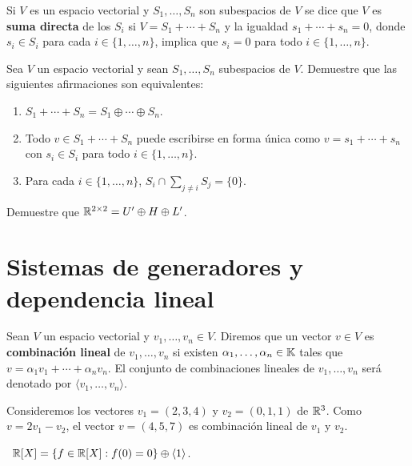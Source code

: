 \begin{block}
    Si $V$ es un espacio vectorial y $S_1,\dots,S_n$ son subespacios de $V$ se
    dice que $V$ es \textbf{suma directa} de los $S_i$ si $V=S_1+\cdots+S_n$ y
    la igualdad $s_1+\cdots+s_n=0$, donde $s_i\in S_i$ para cada
    $i\in\{1,\dots,n\}$, implica que $s_i=0$ para todo $i\in\{1,\dots,n\}$.
\end{block}

\begin{xca}
    Sea $V$ un espacio vectorial y sean $S_1,\dots,S_n$ subespacios de $V$.
    Demuestre que las siguientes afirmaciones son equivalentes:
    \begin{enumerate}
        \item $S_1+\cdots+S_n=S_1\oplus\cdots\oplus S_n$.
        \item Todo $v\in S_1+\cdots+S_n$ puede escribirse en forma única como
            $v=s_1+\cdots+s_n$ con $s_i\in S_i$ para todo $i\in\{1,\dots,n\}$. 
        \item Para cada $i\in\{1,\dots,n\}$, $S_i\cap \sum_{j\ne i}S_j=\{0\}$.
    \end{enumerate}
\end{xca}

\begin{xca}
	Demuestre que $\mathbb{R}^{2\times 2}=U'\oplus H\oplus L'$. 
\end{xca}

\section{Sistemas de generadores y dependencia lineal}

\begin{block}
    Sean $V$ un espacio vectorial y $v_1,\dots,v_n\in V$. Diremos que un vector
    $v\in V$ es \textbf{combinación lineal} de $v_1,\dots,v_n$ si existen
    $\alpha_1,\dots,\alpha_n\in\mathbb{K}$ tales que $v = \alpha_1v_1+\cdots+\alpha_n
    v_n$.  El conjunto de combinaciones lineales de $v_1,\dots,v_n$ será
    denotado por $\langle v_1,\dots,v_n\rangle$.
\end{block}

\begin{example}
    Consideremos los vectores $v_1=(2,3,4)$ y $v_2=(0,1,1)$ de $\mathbb{R}^3$.  Como
    $v=2v_1-v_2$, el vector $v=(4,5,7)$ es combinación lineal de $v_1$ y $v_2$.
\end{example}

\begin{example}\
	$\mathbb{R}[X]=\{f\in\mathbb{R}[X]:f(0)=0\}\oplus\langle 1\rangle$.
\end{example}

